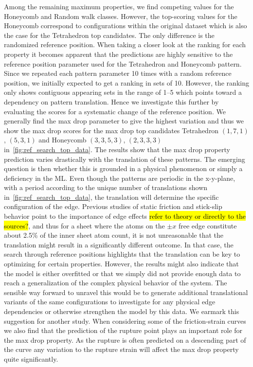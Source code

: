 Among the remaining maximum properties, we find competing values for the
Honeycomb and Random walk classes. However, the top-scoring values for the Honeycomb correspond to configurations within the original dataset which is also the case for the Tetrahedron top candidates. The only difference is the randomized reference position. When taking a closer look at the ranking for
each property it becomes apparent that the predictions are highly sensitive to
the reference position parameter used for the Tetrahedron and Honeycomb
pattern. Since we repeated each pattern parameter 10 times with a random reference
position, we initially expected to get a ranking in sets of 10. However, the
ranking only shows contiguous appearing sets in the range of 1--5 which points toward a dependency on pattern translation. Hence we investigate this further by
evaluating the scores for a systematic change of the reference position. We generally find the max drop parameter to give the
highest variation and thus we show the max drop scores for the max drop top candidates Tetrahedron $(1,7,1)$, $(5,3,1)$ and Honeycomb $(3,3,5,3)$, $(2,3,3,3)$ in~\cref{fig:ref_search_top_data}. The results show that the max drop property prediction varies drastically with the translation of these patterns. The emerging question is
then whether this is grounded in a physical phenomenon or simply a
deficiency in the \acrshort{ML}. Even though the patterns are periodic in the
x-y-plane, with a period according to the unique number of translations shown in~\cref{fig:ref_search_top_data}, the translation will determine the specific
configuration of the edge. Previous studies of static friction and stick-slip
behavior point to the importance of edge effects \hl{refer to theory or directly to the sources?}, and thus for a sheet where the atoms on the $\pm x$ free
edge constitute about 2.5\% of the inner sheet atom count, it is not
unreasonable that the translation might result in a significantly different
outcome. In that case, the search through reference positions highlights that
the translation can be key to optimizing for certain properties. However, the
results might also indicate that the model is either overfitted or that we
simply did not provide enough data to reach a generalization of the complex
physical behavior of the system. The sensible way forward to unravel this would
be to generate additional translational variants of the same configurations to
investigate for any physical edge dependencies or otherwise strengthen the
model by this data. We earmark this suggestion for another study. When considering some of the friction-strain curves we also find that the prediction of the rupture point plays an important role for the max drop property. As the rupture is often predicted on a descending part of the curve any variation to the rupture strain will affect the max drop property quite significantly.


